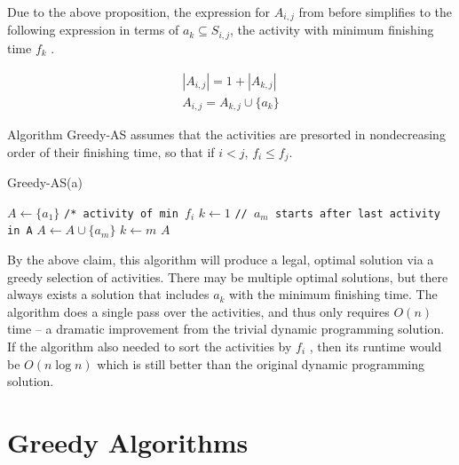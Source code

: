 \documentclass [12pt]{article}
\theoremstyle{definition}
\begin{document}
Due to the above proposition, the expression for $A_{i ,j}$ from before simplifies to the following
expression in terms of $a_k \subseteq S_{i ,j}$, the activity with minimum finishing time $f_k$ .

\begin{align*}
|A_{i,j}| = 1 + |A_{k,j}| \\
A_{i,j} = A_{k,j} \cup \{a_k \}
\end{align*}

Algorithm Greedy-AS assumes that the activities are presorted in nondecreasing order of their finishing time, so that if $i < j$, $f_i \leq f_j$.

\begin{algorithm}
\caption{Greedy-AS(a)}
\label{alg:greed_as}
\begin{algorithmic}
\State $A \gets \{a_1\}$ \texttt{/* activity of min $f_i$}
\State $k \gets 1$
\State {} {
    \State {} {
        \State \texttt{// $a_m$ starts after last activity in A}
        \State $A \gets A \cup \{a_m\}$
        \State $k \gets m$
    }
}
\State \Return $A$
\end{algorithmic}
\end{algorithm}


By the above claim, this algorithm will produce a legal, optimal solution via a greedy selection of activities. There may be multiple optimal solutions, but there always exists a solution that includes $a_k$ with the minimum finishing time. The algorithm does a single pass over the activities, and thus only requires $O(n)$ time – a dramatic improvement from the trivial dynamic programming solution. If the algorithm also needed to sort the activities by $f_i$ , then its runtime would be $O(n \log n)$ which is still better than the original dynamic programming solution.



\section{Greedy Algorithms}
\end{document}
